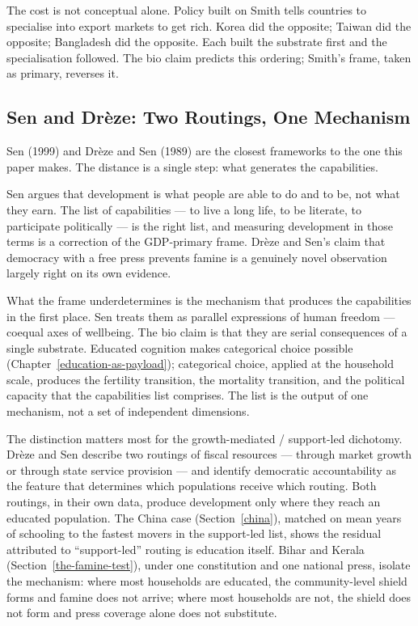 \documentclass[12pt,letterpaper]{article}
\begin{document}
{The cost is not conceptual alone. Policy built on Smith tells countries to specialise into export markets to get rich. Korea did the opposite; Taiwan did the opposite; Bangladesh did the opposite. Each built the substrate first and the specialisation followed. The bio claim predicts this ordering; Smith's frame, taken as primary, reverses it.

\subsection{Sen and Drèze: Two Routings, One Mechanism}\label{sen-and-dreze-two-routings}

Sen (1999) and Drèze and Sen (1989) are the closest frameworks to the one this paper makes. The distance is a single step: what generates the capabilities.

Sen argues that development is what people are able to do and to be, not what they earn. The list of capabilities --- to live a long life, to be literate, to participate politically --- is the right list, and measuring development in those terms is a correction of the GDP-primary frame. Drèze and Sen's claim that democracy with a free press prevents famine is a genuinely novel observation largely right on its own evidence.

What the frame underdetermines is the mechanism that produces the capabilities in the first place. Sen treats them as parallel expressions of human freedom --- coequal axes of wellbeing. The bio claim is that they are serial consequences of a single substrate. Educated cognition makes categorical choice possible (Chapter~\ref{education-as-payload}); categorical choice, applied at the household scale, produces the fertility transition, the mortality transition, and the political capacity that the capabilities list comprises. The list is the output of one mechanism, not a set of independent dimensions.

The distinction matters most for the growth-mediated / support-led dichotomy. Drèze and Sen describe two routings of fiscal resources --- through market growth or through state service provision --- and identify democratic accountability as the feature that determines which populations receive which routing. Both routings, in their own data, produce development only where they reach an educated population. The China case (Section~\ref{china}), matched on mean years of schooling to the fastest movers in the support-led list, shows the residual attributed to ``support-led'' routing is education itself. Bihar and Kerala (Section~\ref{the-famine-test}), under one constitution and one national press, isolate the mechanism: where most households are educated, the community-level shield forms and famine does not arrive; where most households are not, the shield does not form and press coverage alone does not substitute.

}
\end{document}
